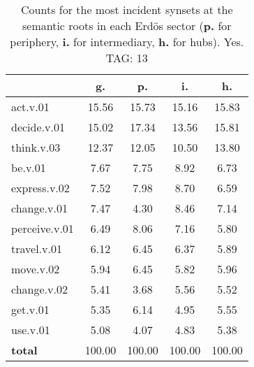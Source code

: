 \begin{table}[h!]
\begin{center}
\begin{tabular}{| l | c | c | c | c |}\hline
 & g. & p. & i. & h. \\\hline
act.v.01 & 15.56  & 15.73  & 15.16  & 15.83 \\\hline
decide.v.01 & 15.02  & 17.34  & 13.56  & 15.81 \\\hline
think.v.03 & 12.37  & 12.05  & 10.50  & 13.80 \\\hline
be.v.01 & 7.67  & 7.75  & 8.92  & 6.73 \\\hline
express.v.02 & 7.52  & 7.98  & 8.70  & 6.59 \\\hline
change.v.01 & 7.47  & 4.30  & 8.46  & 7.14 \\\hline
perceive.v.01 & 6.49  & 8.06  & 7.16  & 5.80 \\\hline
travel.v.01 & 6.12  & 6.45  & 6.37  & 5.89 \\\hline
move.v.02 & 5.94  & 6.45  & 5.82  & 5.96 \\\hline
change.v.02 & 5.41  & 3.68  & 5.56  & 5.52 \\\hline
get.v.01 & 5.35  & 6.14  & 4.95  & 5.55 \\\hline
use.v.01 & 5.08  & 4.07  & 4.83  & 5.38 \\\hline
{{\bf total}} & 100.00  & 100.00  & 100.00  & 100.00 \\\hline
\end{tabular}
\caption{Counts for the most incident synsets at the semantic roots in each Erd\"os sector ({\bf p.} for periphery, {\bf i.} for intermediary, {\bf h.} for hubs). Yes. TAG: 13}
\end{center}
\end{table}